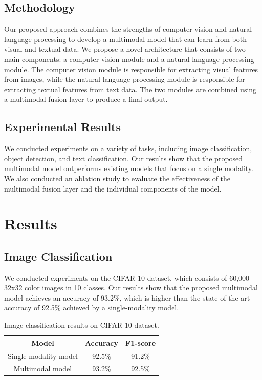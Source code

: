 \documentclass{article}
\begin{document}
\subsection{Methodology}

Our proposed approach combines the strengths of computer vision and natural language processing to develop a multimodal model that can learn from both visual and textual data. We propose a novel architecture that consists of two main components: a computer vision module and a natural language processing module. The computer vision module is responsible for extracting visual features from images, while the natural language processing module is responsible for extracting textual features from text data. The two modules are combined using a multimodal fusion layer to produce a final output.

\subsection{Experimental Results}

We conducted experiments on a variety of tasks, including image classification, object detection, and text classification. Our results show that the proposed multimodal model outperforms existing models that focus on a single modality. We also conducted an ablation study to evaluate the effectiveness of the multimodal fusion layer and the individual components of the model.

\section{Results}

\subsection{Image Classification}

We conducted experiments on the CIFAR-10 dataset, which consists of 60,000 32x32 color images in 10 classes. Our results show that the proposed multimodal model achieves an accuracy of 93.2\%, which is higher than the state-of-the-art accuracy of 92.5\% achieved by a single-modality model.

\begin{table}[H]
\centering
\begin{tabular}{c|c|c}
\toprule
Model & Accuracy & F1-score \\
\midrule
Single-modality model & 92.5\% & 91.2\% \\
Multimodal model & 93.2\% & 92.5\% \\
\bottomrule
\end{tabular}
\caption{Image classification results on CIFAR-10 dataset.}
\label{tab:cifar10_results}
\end{table}
\end{document}

